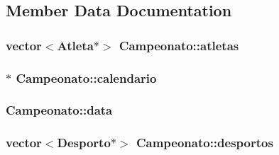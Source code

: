 \subsection{Member Data Documentation}
\hypertarget{class_campeonato_a06b7fd65d33044bff509122140774509}{}
\subsubsection[{atletas}]{\setlength{\rightskip}{0pt plus 5cm}vector$<${\bf Atleta}$\ast$$>$ Campeonato\+::atletas\hspace{0.3cm}{\ttfamily [private]}}\label{class_campeonato_a06b7fd65d33044bff509122140774509}
\hypertarget{class_campeonato_af4bf75bd6daa812d16ab2be60c356f21}{}
\subsubsection[{calendario}]{$\ast$ Campeonato\+::calendario\hspace{0.3cm}{\ttfamily [private]}}\label{class_campeonato_af4bf75bd6daa812d16ab2be60c356f21}
\hypertarget{class_campeonato_ab9a3d4a07de27528556e0ffebda3ba97}{}
\subsubsection[{data}]{ Campeonato\+::data\hspace{0.3cm}{\ttfamily [private]}}\label{class_campeonato_ab9a3d4a07de27528556e0ffebda3ba97}
\hypertarget{class_campeonato_ab65bbad67e796b73176b696457ea39ea}{}
\subsubsection[{desportos}]{\setlength{\rightskip}{0pt plus 5cm}vector$<${\bf Desporto}$\ast$$>$ Campeonato\+::desportos\hspace{0.3cm}{\ttfamily [private]}}\label{class_campeonato_ab65bbad67e796b73176b696457ea39ea}
\hypertarget{class_campeonato_ab677d5217856ce0ff2887a0e335caf2d}{}
